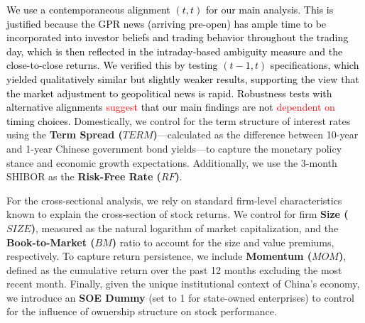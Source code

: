 \documentclass[preprint,12pt,authoryear]{elsarticle}
\begin{document}
\textcolor{black}{We use a contemporaneous alignment $(t, t)$ for our main analysis. This is justified because the GPR news (arriving pre-open) has ample time to be incorporated into investor beliefs and trading behavior throughout the trading day, which is then reflected in the intraday-based ambiguity measure and the close-to-close returns. We verified this by testing $(t-1, t)$ specifications, which yielded qualitatively similar but slightly weaker results, supporting the view that the market adjustment to geopolitical news is rapid. Robustness tests with alternative alignments \textcolor{red}{suggest} that our main findings are not \textcolor{red}{dependent on} timing choices.} Domestically, we control for the term structure of interest rates using the \textbf{Term Spread ($TERM$)}—calculated as the difference between 10-year and 1-year Chinese government bond yields—to capture the monetary policy stance and economic growth expectations. Additionally, we use the 3-month SHIBOR as the \textbf{Risk-Free Rate ($RF$)}.

For the cross-sectional analysis, we rely on standard firm-level characteristics known to explain the cross-section of stock returns. We control for firm \textbf{Size ($SIZE$)}, measured as the natural logarithm of market capitalization, and the \textbf{Book-to-Market ($BM$)} ratio to account for the size and value premiums, respectively. To capture return persistence, we include \textbf{Momentum ($MOM$)}, defined as the cumulative return over the past 12 months excluding the most recent month. Finally, given the unique institutional context of China's economy, we introduce an \textbf{SOE Dummy} (set to 1 for state-owned enterprises) to control for the influence of ownership structure on stock performance.
\end{document}
